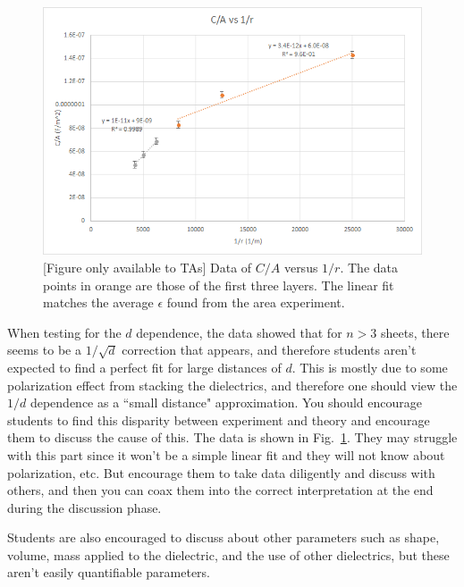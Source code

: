 \documentclass[12pt]{report}
\begin{document}
\begin{figure}[h]
\includegraphics[width=\textwidth]{lab1-results-distance}
\caption{[Figure only available to TAs] Data of $C/A$ versus $1/r$. The data points in orange are those of the first three layers. The linear fit matches the average $\epsilon$ found from the area experiment.}
\label{Fig:Lab1-results-distance}
\end{figure}

\begin{tcolorbox}
When testing for the $d$ dependence, the data showed that for $n>3$ sheets, there seems to be a $1/\sqrt{d}$ correction that appears, and therefore students aren't expected to find a perfect fit for large distances of $d$. This is mostly due to some polarization effect from stacking the dielectrics, and therefore one should view the $1/d$ dependence as a ``small distance" approximation. You should encourage students to find this disparity between experiment and theory and encourage them to discuss the cause of this. The data is shown in Fig.~\ref{Fig:Lab1-results-distance}. 
They may struggle with this part since it won't be a simple linear fit and they will not know about polarization, etc. 
But encourage them to take data diligently and discuss with others, and then you can coax them into the correct interpretation at the end during the discussion phase.
\end{tcolorbox}

\begin{tcolorbox}
Students are also encouraged to discuss about other parameters such as shape, volume, mass applied to the dielectric, and the use of other dielectrics, but these aren't easily quantifiable parameters.
\end{tcolorbox}
\end{document}
